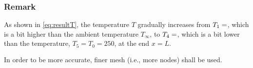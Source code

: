 \subsubsection*{Remark}
As shown in \cref{eq:resultT}, the temperature $T$ gradually increases from $T_1 = \g{T1.n}$,
which is a bit higher than the ambient temperature $T_{\infty}$, to $T_4 =
\g{T4.n}$, which is a bit lower than the temperature, $T_5 = T_0 = 250$, at the
end $x=L$.

In order to be more accurate, finer mesh (i.e., more nodes) shall be used.
